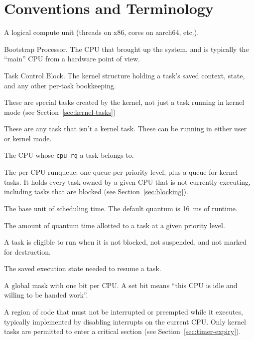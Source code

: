 \documentclass[11pt]{article}
\begin{document}
\section*{Conventions and Terminology}

\begin{description}[style=nextline]
	\item[CPU] A logical compute unit (threads on x86, cores on aarch64, etc.).
	\item[BSP] Bootstrap Processor. The CPU that brought up the system, and is typically the ``main'' CPU from a hardware point of view.
	\item[TCB] Task Control Block. The kernel structure holding a task's saved context, state, and any other per-task bookkeeping.
	\item[Kernel Task] These are special tasks created by the kernel, not just a task running in kernel mode (see Section~\ref{sec:kernel-tasks})
	\item[Normal Task] These are any task that isn't a kernel task. These can be running in either user or kernel mode.
	\item[Owning CPU] The CPU whose \texttt{cpu\_rq} a task belongs to.
	\item[\texttt{cpu\_rq}] The per-CPU runqueue: one queue per priority level, plus a queue for kernel tasks. It holds every task owned by a given CPU that is not currently executing, including tasks that are blocked (see Section~\ref{sec:blocking}).
	\item[Quantum] The base unit of scheduling time. The default quantum is 16~ms of runtime.
	\item[Quanta] The amount of quantum time allotted to a task at a given priority level.
	\item[Eligible] A task is eligible to run when it is not blocked, not suspended, and not marked for destruction.
	\item[Context] The saved execution state needed to resume a task.
	\item[Idle mask] A global mask with one bit per CPU. A set bit means ``this CPU is idle and willing to be handed work''.
	\item[Critical Section] A region of code that must not be interrupted or preempted while it executes, typically implemented by disabling interrupts on the current CPU. Only kernel tasks are permitted to enter a critical section (see Section~\ref{sec:timer-expiry}).
\end{description}
\end{document}
